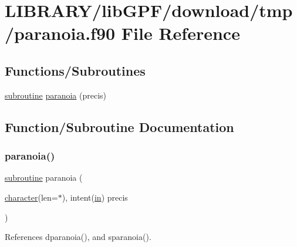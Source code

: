 \hypertarget{paranoia_8f90}{}\section{L\+I\+B\+R\+A\+R\+Y/lib\+G\+P\+F/download/tmp/paranoia.f90 File Reference}
\label{paranoia_8f90}
\subsection*{Functions/\+Subroutines}
\begin{DoxyCompactItemize}
\item 
\hyperlink{M__stopwatch_83_8txt_acfbcff50169d691ff02d4a123ed70482}{subroutine} \hyperlink{paranoia_8f90_a244e132f423de162d796b1bea4903638}{paranoia} (precis)
\end{DoxyCompactItemize}


\subsection{Function/\+Subroutine Documentation}
\mbox{\label{paranoia_8f90_a244e132f423de162d796b1bea4903638}} 
\subsubsection{\texorpdfstring{paranoia()}{paranoia()}}
{\footnotesize\ttfamily \hyperlink{M__stopwatch_83_8txt_acfbcff50169d691ff02d4a123ed70482}{subroutine} paranoia (\begin{DoxyParamCaption}\item[{\hyperlink{option__stopwatch_83_8txt_abd4b21fbbd175834027b5224bfe97e66}{character}(len=$\ast$), intent(\hyperlink{M__journal_83_8txt_afce72651d1eed785a2132bee863b2f38}{in})}]{precis }\end{DoxyParamCaption})}



References dparanoia(), and sparanoia().

